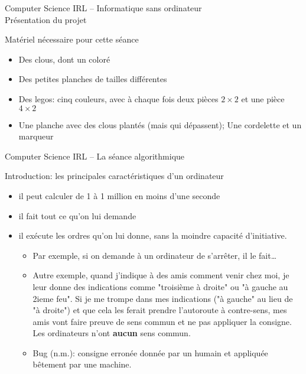 \documentclass[final,hyperref={pdfpagelabels=false}]{beamer}
\renewenvironment{Coupe}{   }{   }
\renewcommand*{\large}{\fontsize{\resultlargeX}{\resultlargeY}\selectfont}
\begin{document}
\begin{Coupe}
\begin{frame}{Computer Science IRL -- Informatique sans ordinateur\\[-5pt]
  {\large Présentation du projet}}
  \begin{block}{Matériel nécessaire pour cette séance}
    \begin{itemize}
    \item Des clous, dont un coloré
    \item Des petites planches de tailles différentes
    \item Des legos: cinq couleurs, avec à chaque fois deux pièces $2\times2$ et une
      pièce $4\times2$
    \item Une planche avec des clous plantés (mais qui dépassent); Une cordelette et un marqueur
    \end{itemize}
  \end{block}
\end{frame}
\begin{frame}{Computer Science IRL -- La séance algorithmique}
  \begin{block}{Introduction: les principales caractéristiques d'un ordinateur}
    \begin{itemize}\vspace{-.2\baselineskip}
    \item {} il peut calculer de 1 à 1
      million en moins d'une seconde
    \item {} il fait tout ce qu'on lui demande
    \item {} il exécute les
      ordres qu'on lui donne, sans la moindre capacité d'initiative.
      \begin{itemize}\vspace{-.8\baselineskip}
      \item Par exemple, si on demande à un ordinateur de s'arrêter, il le fait\ldots
      \item Autre exemple, quand j'indique à des amis comment venir chez moi,
        je leur donne des indications comme "troisième à droite" ou "à gauche
        au 2ieme feu". Si je me trompe dans mes indications ("à gauche" au lieu
        de "à droite") et que cela les ferait prendre l'autoroute à
        contre-sens, mes amis vont faire preuve de sens commun et ne pas
        appliquer la consigne. Les ordinateurs n'ont \textbf{aucun} sens commun.
      \item Bug (n.m.): consigne erronée donnée par un humain et appliquée bêtement par une machine.


\end{itemize}
\end{itemize}
\end{block}
\end{frame}
\end{Coupe}
\end{document}
